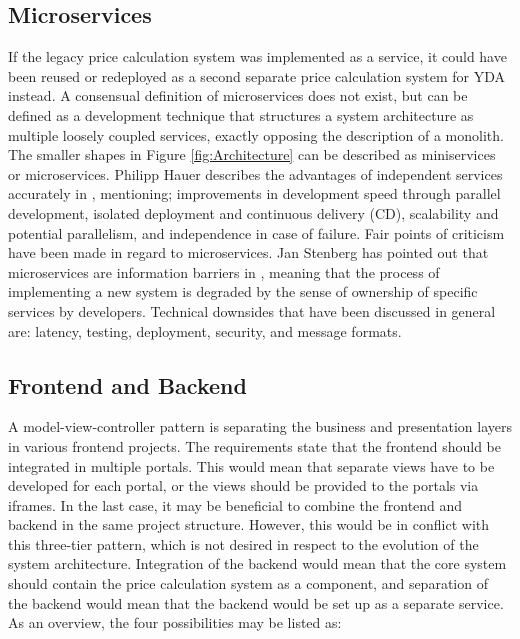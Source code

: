 \subsection{Microservices}
If the legacy price calculation system was implemented as a service, it could have been reused or redeployed as a second separate price calculation system for YDA instead. A consensual definition of microservices does not exist, but can be defined as a development technique that structures a system architecture as multiple loosely coupled services, exactly opposing the description of a monolith. The smaller shapes in Figure \ref{fig:Architecture} can be described as miniservices or microservices. Philipp Hauer describes the advantages of independent services accurately in \cite{microservices}, mentioning; improvements in development speed through parallel development, isolated deployment and continuous delivery (CD), scalability and potential parallelism, and independence in case of failure. Fair points of criticism have been made in regard to microservices. Jan Stenberg has pointed out that microservices are information barriers in \cite{JS-microservices}, meaning that the process of implementing a new system is degraded by the sense of ownership of specific services by developers. Technical downsides that have been discussed in general are: latency, testing, deployment, security, and message formats.

\subsection{Frontend and Backend}
A model-view-controller pattern is separating the business and presentation layers in various frontend projects. The requirements state that the frontend should be integrated in multiple portals. This would mean that separate views have to be developed for each portal, or the views should be provided to the portals via iframes. In the last case, it may be beneficial to combine the frontend and backend in the same project structure. However, this would be in conflict with this three-tier pattern, which is not desired in respect to the evolution of the system architecture. Integration of the backend would mean that the core system should contain the price calculation system as a component, and separation of the backend would mean that the backend would be set up as a separate service. As an overview, the four possibilities may be listed as:

